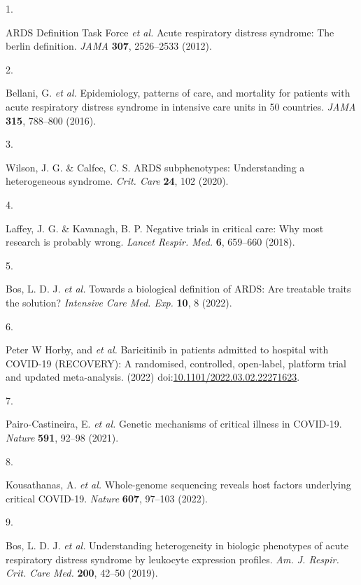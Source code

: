 \documentclass[
  11,
  a4paper,
]{article}
\newlength{\cslhangindent}
\newlength{\csllabelwidth}
\newlength{\cslentryspacingunit} %
\newenvironment{CSLReferences}[2] %
 {%
  \setlength{\parindent}{0pt}
  \ifodd #1
  \let\oldpar\par
  \def\par{\hangindent=\cslhangindent\oldpar}
  \fi
  \setlength{\parskip}{#2\cslentryspacingunit}
 }%
 {}
\newcommand{\CSLLeftMargin}[1]{\parbox[t]{\csllabelwidth}{#1}}
\newcommand{\CSLRightInline}[1]{\parbox[t]{\linewidth - \csllabelwidth}{#1}\break}
\begin{document}
\hypertarget{refs}{}
\begin{CSLReferences}{0}{0}
\leavevmode{}%
\CSLLeftMargin{1. }%
\CSLRightInline{ARDS Definition Task Force \emph{et al.} Acute
respiratory distress syndrome: The berlin definition. \emph{JAMA}
\textbf{307}, 2526--2533 (2012).}

\leavevmode{}%
\CSLLeftMargin{2. }%
\CSLRightInline{Bellani, G. \emph{et al.} Epidemiology, patterns of
care, and mortality for patients with acute respiratory distress
syndrome in intensive care units in 50 countries. \emph{JAMA}
\textbf{315}, 788--800 (2016).}

\leavevmode{}%
\CSLLeftMargin{3. }%
\CSLRightInline{Wilson, J. G. \& Calfee, C. S. {ARDS} subphenotypes:
Understanding a heterogeneous syndrome. \emph{Crit. Care} \textbf{24},
102 (2020).}

\leavevmode{}%
\CSLLeftMargin{4. }%
\CSLRightInline{Laffey, J. G. \& Kavanagh, B. P. Negative trials in
critical care: Why most research is probably wrong. \emph{Lancet Respir.
Med.} \textbf{6}, 659--660 (2018).}

\leavevmode{}%
\CSLLeftMargin{5. }%
\CSLRightInline{Bos, L. D. J. \emph{et al.} Towards a biological
definition of {ARDS}: Are treatable traits the solution? \emph{Intensive
Care Med. Exp.} \textbf{10}, 8 (2022).}

\leavevmode{}%
\CSLLeftMargin{6. }%
\CSLRightInline{Peter W Horby, and \emph{et al.} Baricitinib in patients
admitted to hospital with {COVID}-19 ({RECOVERY}): A randomised,
controlled, open-label, platform trial and updated meta-analysis. (2022)
doi:\href{https://doi.org/10.1101/2022.03.02.22271623}{10.1101/2022.03.02.22271623}.}

\leavevmode{}%
\CSLLeftMargin{7. }%
\CSLRightInline{Pairo-Castineira, E. \emph{et al.} Genetic mechanisms of
critical illness in {COVID-19}. \emph{Nature} \textbf{591}, 92--98
(2021).}

\leavevmode{}%
\CSLLeftMargin{8. }%
\CSLRightInline{Kousathanas, A. \emph{et al.} Whole-genome sequencing
reveals host factors underlying critical {COVID-19}. \emph{Nature}
\textbf{607}, 97--103 (2022).}

\leavevmode{}%
\CSLLeftMargin{9. }%
\CSLRightInline{Bos, L. D. J. \emph{et al.} Understanding heterogeneity
in biologic phenotypes of acute respiratory distress syndrome by
leukocyte expression profiles. \emph{Am. J. Respir. Crit. Care Med.}
\textbf{200}, 42--50 (2019).}


\end{CSLReferences}
\end{document}

